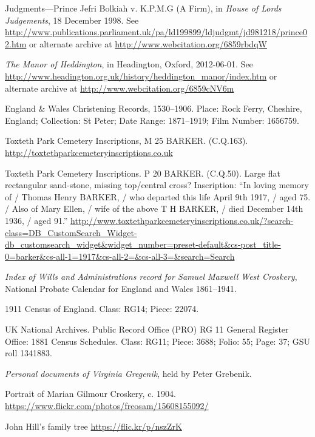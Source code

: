 \begin{thebibliography}{99}
	Judgments---Prince Jefri Bolkiah v. K.P.M.G (A Firm), in \emph{House of Lords Judgements}, 18 December 1998.
	See \url{http://www.publications.parliament.uk/pa/ld199899/ldjudgmt/jd981218/prince02.htm}
	or alternate archive at \url{http://www.webcitation.org/6859rbdqW}

	\emph{The Manor of Heddington}, in Headington, Oxford, 2012-06-01.
	See \url{http://www.headington.org.uk/history/heddington_manor/index.htm} or alternate archive at \url{http://www.webcitation.org/6859cNV6m}

	England \& Wales Christening Records, 1530--1906.
	Place: Rock Ferry, Cheshire, England; Collection: St Peter; Date Range: 1871--1919; Film Number: 1656759.

	Toxteth Park Cemetery Inscriptions, M 25 BARKER. (C.Q.163). \url{http://toxtethparkcemeteryinscriptions.co.uk}

	Toxteth Park Cemetery Inscriptions. P 20 BARKER. (C.Q.50).
	Large flat rectangular sand-stone, missing top/central cross? Inscription:
	``In loving memory of / Thomas Henry BARKER, / who departed this life April 9th 1917, / aged 75. /
	Also of Mary Ellen, / wife of the above T H BARKER, / died December 14th 1936, / aged 91.''
	\url{http://www.toxtethparkcemeteryinscriptions.co.uk/?search-class=DB_CustomSearch_Widget-db_customsearch_widget&widget_number=preset-default&cs-post_title-0=barker&cs-all-1=1917&cs-all-2=&cs-all-3=&search=Search}

	\emph{Index of Wills and Administrations record for Samuel Maxwell West Croskery},
	National Probate Calendar for England and Wales 1861--1941.

	1911 Census of England. Class: RG14; Piece: 22074.

	UK National Archives. Public Record Office (PRO) RG 11 General Register Office: 1881 Census Schedules.
	Class: RG11; Piece: 3688; Folio: 55; Page: 37; GSU roll 1341883.

	\emph{Personal documents of Virginia Gregenik}, held by Peter Grebenik.

	Portrait of Marian Gilmour Croskery, c. 1904.
	\url{https://www.flickr.com/photos/freosam/15608155092/}

	John Hill's family tree \url{https://flic.kr/p/nszZrK}


\end{thebibliography}
